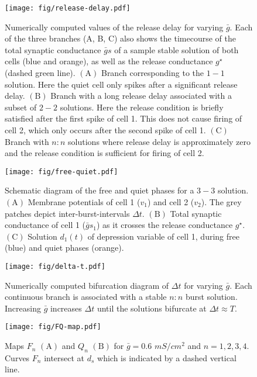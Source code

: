 \documentclass[utf8, draft]{frontiersFPHY} %
\newcommand{\gbar}{\bar g}
\newcommand{\delt}{\Delta t}
\begin{document}
\begin{figure}[h!]
  \centering
  \texttt{[image: fig/release-delay.pdf]}
  \caption{Numerically computed values of the release delay for varying $\gbar$. Each of
    the three branches (A, B, C) also shows the timecourse of the total synaptic
    conductance $\gbar s$ of a sample stable solution of both cells (blue and orange),
    as well as the release conductance $g^{\star}$ (dashed green line).
    $\bm{\mathrm{(A)}}$ Branch corresponding to the $1-1$ solution. Here the quiet
    cell only spikes after a significant release delay. $\bm{\mathrm{(B)}}$ Branch with
    a long release delay associated with a subset of $2-2$ solutions. Here the release
    condition is briefly satisfied after the first spike of cell 1. This does not cause
    firing of cell 2, which only occurs after the second spike of cell 1.
    $\bm{\mathrm{(C)}}$ Branch with $n:n$ solutions  where release delay is
    approximately zero and the release condition is sufficient for firing of cell 2.
    ~\label{fig:release-delay}}
\end{figure}

\begin{figure}[h!]
  \centering
  \texttt{[image: fig/free-quiet.pdf]}
  \caption{Schematic diagram of the free and quiet phases for a $3-3$ solution.
    $\bm{\mathrm{(A)}}$ Membrane potentials of cell 1 ($v_{1}$) and cell 2 ($v_{2}$).
    The grey patches depict inter-burst-intervals $\delt$. $\bm{\mathrm{(B)}}$ Total
    synaptic conductance of cell 1 ($\gbar s_1$) as it crosses the release conductance
    $g^{\star}$. $\bm{\mathrm{(C)}}$ Solution $d_1(t)$ of depression variable of cell
    1, during free (blue) and quiet phases (orange).~\label{fig:free-quiet1}}
\end{figure}

\begin{figure}[h!]
  \centering
  \texttt{[image: fig/delta-t.pdf]}
  \caption{Numerically computed bifurcation diagram of $\delt$ for varying $\gbar$.
    Each continuous branch is associated with a stable $n:n$ burst solution. Increasing
    $\gbar$ increases $\Delta t$ until the solutions bifurcate at $\Delta t\approx
    T$.~\label{fig:delta-t}}
\end{figure}

\begin{figure}[h!]
  \centering
  \texttt{[image: fig/FQ-map.pdf]}
  \caption{Maps $F_n$ $\bm{\mathrm{(A)}}$ and $Q_n$ $\bm{\mathrm{(B)}}$ for
  $\gbar=0.6$ $\si{mS/cm^{2}}$ and $n=1,2,3,4$. Curves $F_n$ intersect at
  $d_{s}$ which is indicated by a dashed vertical line.~\label{fig:FQ-map}}
\end{figure}
\end{document}
